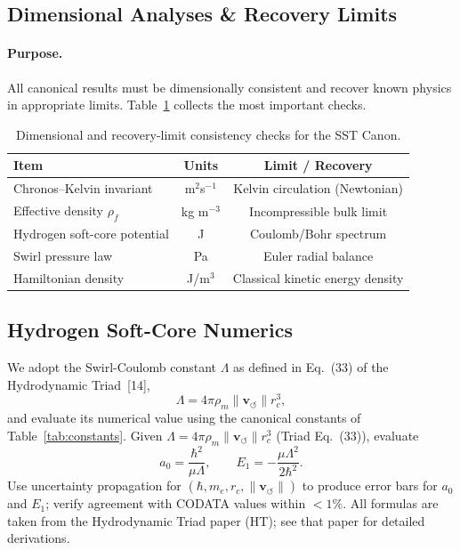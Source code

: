 \documentclass[10pt,reprint,aps,onecolumn,nofootinbib]{revtex4-2}
\begin{document}
\subsection{Dimensional Analyses \& Recovery Limits}
\label{canon58:appB}
\paragraph{Purpose.}
    All canonical results must be dimensionally consistent and recover
    known physics in appropriate limits. Table~\ref{canon58:dim-checks}
    collects the most important checks.
    \begin{table}[h!]
        \centering
        \begin{tabular}{|l|c|c|}
            \hline
            \textbf{Item} & \textbf{Units} & \textbf{Limit / Recovery} \\
            \hline
            Chronos--Kelvin invariant & m$^{2}$s$^{-1}$ & Kelvin circulation (Newtonian) \\
            Effective density $\rho_{\!f}$ & kg m$^{-3}$ & Incompressible bulk limit \\
            Hydrogen soft-core potential & J & Coulomb/Bohr spectrum \\
            Swirl pressure law & Pa & Euler radial balance \\
            Hamiltonian density & J/m$^{3}$ & Classical kinetic energy density \\
            \hline
        \end{tabular}
        \caption{Dimensional and recovery-limit consistency checks for the SST Canon.}
        \label{canon58:dim-checks}
    \end{table}


\subsection{Hydrogen Soft-Core Numerics}
\label{canon58:appD}
We adopt the Swirl-Coulomb constant $\Lambda$ as defined in Eq.~(33) of the Hydrodynamic Triad~[14],
\[
    \Lambda = 4\pi \rho_{\!m} \lVert \mathbf{v}_{\!\boldsymbol{\circlearrowleft}}\rVert r_c^{3},
\]
and evaluate its numerical value using the canonical constants of Table~\ref{tab:constants}.
Given $\Lambda = 4\pi \rho_{\!m} \lVert \mathbf{v}_{\!\boldsymbol{\circlearrowleft}}\rVert r_c^{3}$ (Triad Eq.~(33)),
evaluate
\[
    a_0 = \frac{\hbar^{2}}{\mu \Lambda}, \qquad
    E_1 = - \frac{\mu \Lambda^{2}}{2\hbar^{2}}.
\]
Use uncertainty propagation for $(\hbar, m_e, r_c, \lVert \mathbf{v}_{\!\boldsymbol{\circlearrowleft}}\rVert)$ to
produce error bars for $a_0$ and $E_1$; verify agreement with CODATA values
within $<1\%$. All formulas are taken from the Hydrodynamic Triad paper (HT); see that paper for detailed derivations.
\end{document}
